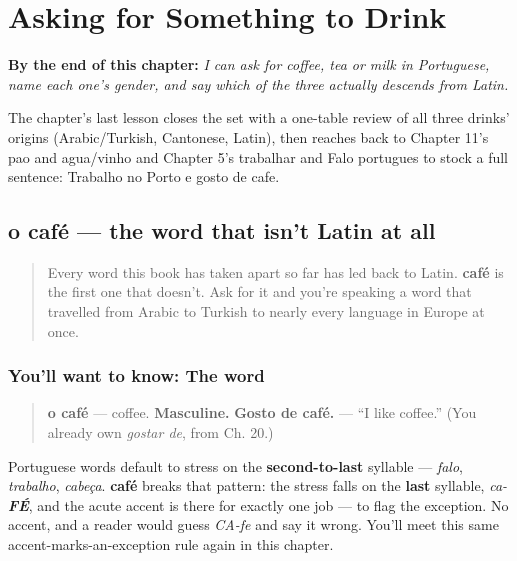 
\chapter{Asking for Something to Drink}
\label{ch:pt-coffee-tea-milk}

\begin{chapteropening}
\textbf{By the end of this chapter:} \emph{I can ask for coffee, tea or milk in Portuguese, name each one's gender, and say which of the three actually descends from Latin.}

The chapter's last lesson closes the set with a one-table review of all three drinks' origins (Arabic/Turkish, Cantonese, Latin), then reaches back to Chapter 11's pao and agua/vinho and Chapter 5's trabalhar and Falo portugues to stock a full sentence: Trabalho no Porto e gosto de cafe.
\end{chapteropening}

\section[o café]{o café — the word that isn't Latin at all}

\label{lesson:PT-C23-cafe}



\begin{quote}
Every word this book has taken apart so far has led back to Latin. \textbf{café} is the first one that doesn't. Ask for it and you're speaking a word that travelled from Arabic to Turkish to nearly every language in Europe at once.
\end{quote}

\subsection*{You'll want to know: The word}
\begin{quote}
\textbf{o café} — coffee. \textbf{Masculine.} \textbf{Gosto de café.} — \textquotedblleft{}I like coffee.\textquotedblright{} (You already own \emph{gostar de}, from Ch. 20.)
\end{quote}

\begin{sounds}
Portuguese words default to stress on the \textbf{second-to-last} syllable — \emph{falo}, \emph{trabalho}, \emph{cabeça}. \textbf{café} breaks that pattern: the stress falls on the \textbf{last} syllable, \emph{ca-\textbf{FÉ}}, and the acute accent is there for exactly one job — to flag the exception. No accent, and a reader would guess \emph{CA-fe} and say it wrong. You'll meet this same accent-marks-an-exception rule again in this chapter.
\end{sounds}

